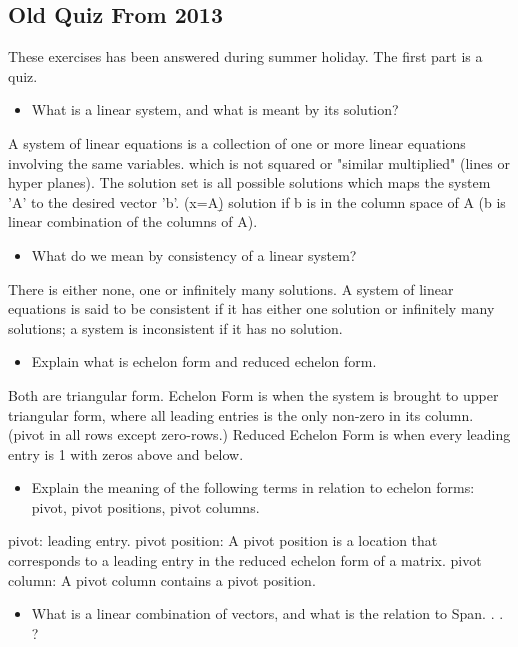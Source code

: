 \subsection{Old Quiz From 2013}
\label{sec:Old Exercises from 2014}
    These exercises has been answered during summer holiday. The first part is a quiz.
    \begin{itemize}
        \item What is a linear system, and what is meant by its solution?
    \end{itemize}
    A system of linear equations is a collection of one or more linear equations involving the same variables. 
    which is not squared or "similar multiplied" (lines or hyper planes).
    The solution set is all possible solutions which maps the system 'A' to the desired vector 'b'. (x=A\b)
    solution if b is in the column space of A (b is linear combination of the columns of A).
\begin{itemize}
    \item What do we mean by consistency of a linear system?
\end{itemize}
    There is either none, one or infinitely many solutions. 
    A system of linear equations is said to be consistent if it has either one solution or infinitely many solutions; 
    a system is inconsistent if it has no solution.
\begin{itemize}
    \item Explain what is echelon form and reduced echelon form.
\end{itemize}
    Both are triangular form.
    Echelon Form is when the system is brought to upper triangular form, where all leading entries is the only non-zero in its column. (pivot in all rows except zero-rows.)
    Reduced Echelon Form is when every leading entry is 1 with zeros above and below.
\begin{itemize}
    \item Explain the meaning of the following terms in relation to echelon forms: pivot, pivot positions, pivot columns.
\end{itemize}
    pivot: leading entry.
    pivot position: A pivot position is a location that corresponds to a leading entry in the reduced echelon form of a matrix.
    pivot column: A pivot column contains a pivot position. 
\begin{itemize}
    \item What is a linear combination of vectors, and what is the relation to Span{. . . }?
\end{itemize}    
